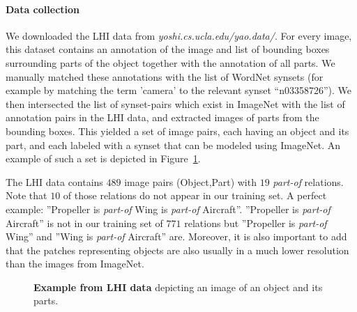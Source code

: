 \paragraph{Data collection}
We downloaded the LHI data from {\em yoshi.cs.ucla.edu/yao.data/}. For
every image, this dataset contains an annotation of the image and list
of bounding boxes surrounding parts of the object together with the
annotation of all parts. We manually matched these annotations with
the list of WordNet synsets (for example by matching the term 'camera'
to the relevant synset ``n03358726''). We then intersected the list of
synset-pairs which exist in ImageNet with the list of annotation pairs
in the LHI data, and extracted images of parts from the bounding
boxes. This yielded a set of image pairs, each having an object and
its part, and each labeled with a synset that can be modeled using
ImageNet. An example of such a set is depicted in Figure~\ref{fig:labelme}.


The LHI data contains $489$ image pairs (Object,Part) with $19$ \textit{part-of}
relations. Note that $10$ of those relations do not appear in our training set.
A perfect example: ''Propeller is \textit{part-of} Wing is \textit{part-of} Aircraft''.
''Propeller is \textit{part-of} Aircraft'' is not in our training set of $771$
relations but ''Propeller is \textit{part-of} Wing'' and ''Wing is
\textit{part-of} Aircraft'' are.
%
Moreover, it is also important to add that the patches representing
objects are also usually in a much lower resolution than the images from
ImageNet.

\begin{figure}[t!]
  \begin{center}
    \caption[Example from LHI data]{{\bf Example from LHI data} depicting an image of an object and its parts.}
    \label{fig:labelme}
    \end{center}
\end{figure}



